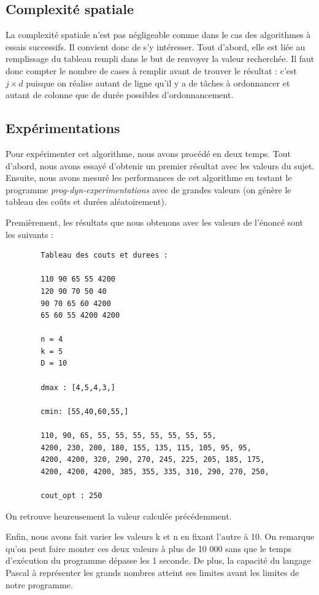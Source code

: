 \documentclass[a4paper, titlepage]{article}
\begin{document}
	\subsection{Complexité spatiale}
		La complexité spatiale n'est pas négligeable comme dans le cas des algorithmes à essais successifs.
		Il convient donc de s'y intéresser.
		Tout d'abord, elle est liée au remplissage du tableau rempli dans le but de renvoyer la valeur recherchée.
		Il faut donc compter le nombre de cases à remplir avant de trouver le résultat : c'est $j \times d$ puisque on réalise autant de ligne qu'il y a de tâches à ordonnancer et autant de colonne que de durée possibles d'ordonnancement.
	
	\subsection{Expérimentations}
		Pour expérimenter cet algorithme, nous avons procédé en deux temps.
		Tout d'abord, nous avons essayé d'obtenir un premier résultat avec les valeurs du sujet.
		Ensuite, nous avons mesuré les performances de cet algorithme en testant le programme \emph{prog-dyn-experimentations} avec de grandes valeurs (on génère le tableau des coûts et durées aléatoirement).
	
		Premièrement, les résultats que nous obtenons avec les valeurs de l'énoncé sont les suivants :
	
		\begin{framed}
		\begin{verbatim}
		Tableau des couts et durees :

		110 90 65 55 4200
		120 90 70 50 40
		90 70 65 60 4200
		65 60 55 4200 4200

		n = 4
		k = 5
		D = 10

		dmax : [4,5,4,3,]

		cmin: [55,40,60,55,]

		110, 90, 65, 55, 55, 55, 55, 55, 55, 55, 
		4200, 230, 200, 180, 155, 135, 115, 105, 95, 95, 
		4200, 4200, 320, 290, 270, 245, 225, 205, 185, 175, 
		4200, 4200, 4200, 385, 355, 335, 310, 290, 270, 250, 

		cout_opt : 250
		\end{verbatim}
		\end{framed}
		
		On retrouve heureusement la valeur calculée précédemment.
		
		Enfin, nous avons fait varier les valeurs k et n en fixant l'autre à 10.
		On remarque qu'on peut faire monter ces deux valeurs à plus de 10 000 sans que le temps d'exécution du programme dépasse les 1 seconde.
		De plus, la capacité du langage Pascal à représenter les grands nombres atteint ses limites avant les limites de notre programme.
		
\end{document}
